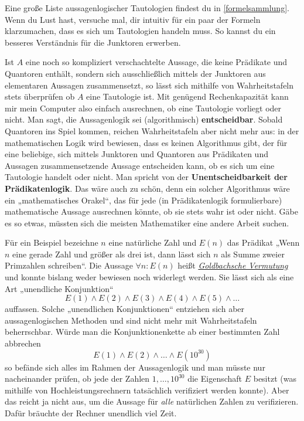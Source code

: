 \begin{bem}
    Eine große Liste aussagenlogischer Tautologien findest du in \cref{formelsammlung}. Wenn du Lust hast, versuche mal, dir intuitiv für ein paar der Formeln klarzumachen, dass es sich um Tautologien handeln muss. So kannst du ein besseres Verständnis für die Junktoren erwerben.
\end{bem}


\begin{vorschau} \label{entscheidbar}
    Ist $A$ eine noch so kompliziert verschachtelte Aussage, die keine Prädikate und Quantoren enthält, sondern sich ausschließlich mittels der Junktoren aus elementaren Aussagen zusammensetzt, so lässt sich mithilfe von Wahrheitstafeln stets überprüfen ob $A$ eine Tautologie ist. Mit genügend Rechenkapazität kann mir mein Computer also einfach ausrechnen, ob eine Tautologie vorliegt oder nicht. Man sagt, die Aussagenlogik sei (algorithmisch) \textbf{entscheidbar}. Sobald Quantoren ins Spiel kommen, reichen Wahrheitstafeln aber nicht mehr aus: in der mathematischen Logik wird bewiesen, dass es keinen Algorithmus gibt, der für eine beliebige, sich mittels Junktoren und Quantoren aus Prädikaten und Aussagen zusammensetzende Aussage entscheiden kann, ob es sich um eine Tautologie handelt oder nicht. Man spricht von der \textbf{Unentscheidbarkeit der Prädikatenlogik}. Das wäre auch zu schön, denn ein solcher Algorithmus wäre ein „mathematisches Orakel“, das für jede (in Prädikatenlogik formulierbare) mathematische Aussage ausrechnen könnte, ob sie stets wahr ist oder nicht. Gäbe es so etwas, müssten sich die meisten Mathematiker eine andere Arbeit suchen.
    
    Für ein Beispiel bezeichne $n$ eine natürliche Zahl und $E(n)$ das Prädikat „Wenn $n$ eine gerade Zahl und größer als drei ist, dann lässt sich $n$ als Summe zweier Primzahlen schreiben“. Die Aussage $\forall n:E(n)$ heißt \href{https://de.wikipedia.org/wiki/Goldbachsche_Vermutung}{\emph{Goldbachsche Vermutung}} und konnte bislang weder bewiesen noch widerlegt werden. Sie lässt sich als eine Art „unendliche Konjunktion“
        \[E(1)\land  E(2)\land E(3)\land E(4)\land E(5) \land \dots \]
    auffassen. Solche „unendlichen Konjunktionen“ entziehen sich aber aussagenlogischen Methoden und sind nicht mehr mit Wahrheitstafeln beherrschbar. Würde man die Konjunktionenkette ab einer bestimmten Zahl abbrechen
        \[ E(1)\land E(2)\land\dots \land E(10^{30}) \]
    so befände sich alles im Rahmen der Aussagenlogik und man müsste nur nacheinander prüfen, ob jede der Zahlen $1,\dots , 10^{30}$ die Eigenschaft $E$ besitzt (was mithilfe von Hochleistungsrechnern tatsächlich verifiziert werden konnte). Aber das reicht ja nicht aus, um die Aussage für \emph{alle} natürlichen Zahlen zu verifizieren. Dafür bräuchte der Rechner unendlich viel Zeit.
    

\end{vorschau}
